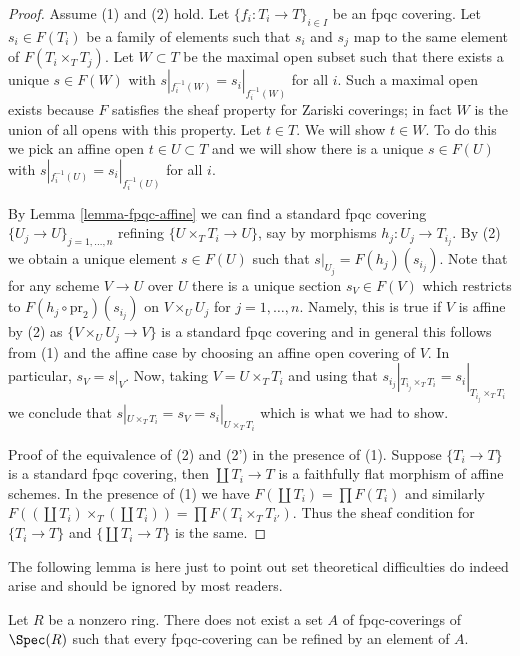 \begin{proof}
Assume (1) and (2) hold.
Let $\{f_i : T_i \to T\}_{i \in I}$ be an fpqc covering. Let $s_i \in F(T_i)$
be a family of elements such that $s_i$ and $s_j$ map to the same element
of $F(T_i \times_T T_j)$. Let $W \subset T$ be the maximal open subset
such that there exists a unique $s \in F(W)$ with
$s|_{f_i^{-1}(W)} = s_i|_{f_i^{-1}(W)}$ for all $i$.
Such a maximal open exists because $F$ satisfies the
sheaf property for Zariski coverings; in fact $W$ is the
union of all opens with this property. Let $t \in T$.
We will show $t \in W$. To do this we pick an affine open
$t \in U \subset T$ and we will show there is a unique
$s \in F(U)$ with
$s|_{f_i^{-1}(U)} = s_i|_{f_i^{-1}(U)}$ for all $i$.

\medskip\noindent
By Lemma \ref{lemma-fpqc-affine} we can find a standard fpqc covering
$\{U_j \to U\}_{j = 1, \ldots, n}$ refining $\{U \times_T T_i \to U\}$,
say by morphisms $h_j : U_j \to T_{i_j}$. By (2) we obtain a unique element
$s \in F(U)$ such that $s|_{U_j} = F(h_j)(s_{i_j})$. Note that for any
scheme $V \to U$ over $U$ there is a unique section $s_V \in F(V)$
which restricts to $F(h_j \circ \text{pr}_2)(s_{i_j})$ on
$V \times_U U_j$ for $j = 1, \ldots, n$. Namely, this is true if $V$
is affine by (2) as $\{V \times_U U_j \to V\}$ is a standard fpqc covering
and in general this follows from (1) and the affine case by choosing an
affine open covering of $V$. In particular, $s_V = s|_V$.
Now, taking $V = U \times_T T_i$ and using that
$s_{i_j}|_{T_{i_j} \times_T T_i} = s_i|_{T_{i_j} \times_T T_i}$
we conclude that $s|_{U \times_T T_i} = s_V = s_i|_{U \times_T T_i}$
which is what we had to show.

\medskip\noindent
Proof of the equivalence of (2) and (2') in the presence of (1).
Suppose $\{T_i \to T\}$ is a standard fpqc covering, then
$\coprod T_i \to T$ is a faithfully flat morphism of affine schemes.
In the presence of (1) we have $F(\coprod T_i) = \prod F(T_i)$
and similarly
$F((\coprod T_i) \times_T (\coprod T_i)) = \prod F(T_i \times_T T_{i'})$.
Thus the sheaf condition for $\{T_i \to T\}$ and $\{\coprod T_i \to T\}$
is the same.
\end{proof}

\noindent
The following lemma is here just to point out set theoretical difficulties
do indeed arise and should be ignored by most readers.

\begin{lemma}
\label{lemma-no-set-of-fpqc-covers-is-initial}
Let $R$ be a nonzero ring. There does not exist a set $A$ of
fpqc-coverings of $\Spec(R)$ such that every fpqc-covering can
be refined by an element of $A$.
\end{lemma}

